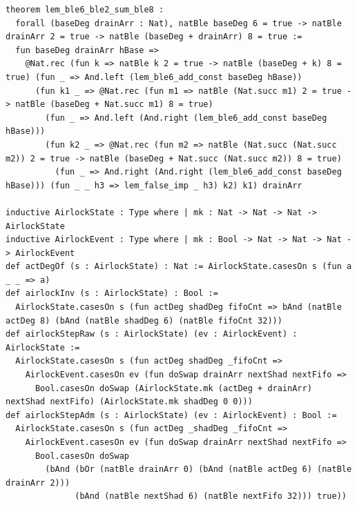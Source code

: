\documentclass[11pt,letterpaper]{article}
\theoremstyle{spectralthm}
\begin{document}
\begin{lstlisting}[language=Lean4,caption={Standalone Pure Init.Prelude Term-Mode Lean 4 Kernel Suite (thm30--thm61, v0.0.0, 0 sorry, 0 axioms).},label={lst:lean_unified}]
theorem lem_ble6_ble2_sum_ble8 :
  forall (baseDeg drainArr : Nat), natBle baseDeg 6 = true -> natBle drainArr 2 = true -> natBle (baseDeg + drainArr) 8 = true :=
  fun baseDeg drainArr hBase =>
    @Nat.rec (fun k => natBle k 2 = true -> natBle (baseDeg + k) 8 = true) (fun _ => And.left (lem_ble6_add_const baseDeg hBase))
      (fun k1 _ => @Nat.rec (fun m1 => natBle (Nat.succ m1) 2 = true -> natBle (baseDeg + Nat.succ m1) 8 = true)
        (fun _ => And.left (And.right (lem_ble6_add_const baseDeg hBase)))
        (fun k2 _ => @Nat.rec (fun m2 => natBle (Nat.succ (Nat.succ m2)) 2 = true -> natBle (baseDeg + Nat.succ (Nat.succ m2)) 8 = true)
          (fun _ => And.right (And.right (lem_ble6_add_const baseDeg hBase))) (fun _ _ h3 => lem_false_imp _ h3) k2) k1) drainArr

inductive AirlockState : Type where | mk : Nat -> Nat -> Nat -> AirlockState
inductive AirlockEvent : Type where | mk : Bool -> Nat -> Nat -> Nat -> AirlockEvent
def actDegOf (s : AirlockState) : Nat := AirlockState.casesOn s (fun a _ _ => a)
def airlockInv (s : AirlockState) : Bool :=
  AirlockState.casesOn s (fun actDeg shadDeg fifoCnt => bAnd (natBle actDeg 8) (bAnd (natBle shadDeg 6) (natBle fifoCnt 32)))
def airlockStepRaw (s : AirlockState) (ev : AirlockEvent) : AirlockState :=
  AirlockState.casesOn s (fun actDeg shadDeg _fifoCnt =>
    AirlockEvent.casesOn ev (fun doSwap drainArr nextShad nextFifo =>
      Bool.casesOn doSwap (AirlockState.mk (actDeg + drainArr) nextShad nextFifo) (AirlockState.mk shadDeg 0 0)))
def airlockStepAdm (s : AirlockState) (ev : AirlockEvent) : Bool :=
  AirlockState.casesOn s (fun actDeg _shadDeg _fifoCnt =>
    AirlockEvent.casesOn ev (fun doSwap drainArr nextShad nextFifo =>
      Bool.casesOn doSwap
        (bAnd (bOr (natBle drainArr 0) (bAnd (natBle actDeg 6) (natBle drainArr 2)))
              (bAnd (natBle nextShad 6) (natBle nextFifo 32))) true))


\end{lstlisting}
\end{document}

